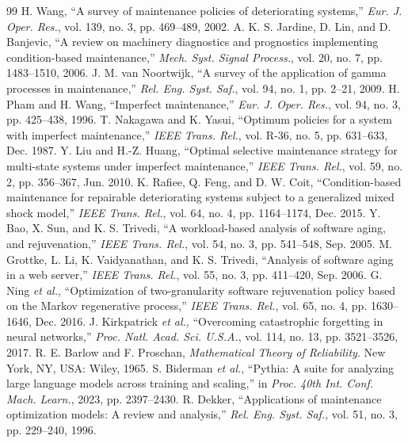 \documentclass[journal]{IEEEtran}
\begin{document}
\begin{thebibliography}{99}
 H. Wang, ``A survey of maintenance policies of deteriorating systems,'' \emph{Eur. J. Oper. Res.}, vol. 139, no. 3, pp. 469--489, 2002.
 A. K. S. Jardine, D. Lin, and D. Banjevic, ``A review on machinery diagnostics and prognostics implementing condition-based maintenance,'' \emph{Mech. Syst. Signal Process.}, vol. 20, no. 7, pp. 1483--1510, 2006.
 J. M. van Noortwijk, ``A survey of the application of gamma processes in maintenance,'' \emph{Rel. Eng. Syst. Saf.}, vol. 94, no. 1, pp. 2--21, 2009.
 H. Pham and H. Wang, ``Imperfect maintenance,'' \emph{Eur. J. Oper. Res.}, vol. 94, no. 3, pp. 425--438, 1996.
 T. Nakagawa and K. Yasui, ``Optimum policies for a system with imperfect maintenance,'' \emph{IEEE Trans. Rel.}, vol. R-36, no. 5, pp. 631--633, Dec. 1987.
 Y. Liu and H.-Z. Huang, ``Optimal selective maintenance strategy for multi-state systems under imperfect maintenance,'' \emph{IEEE Trans. Rel.}, vol. 59, no. 2, pp. 356--367, Jun. 2010.
 K. Rafiee, Q. Feng, and D. W. Coit, ``Condition-based maintenance for repairable deteriorating systems subject to a generalized mixed shock model,'' \emph{IEEE Trans. Rel.}, vol. 64, no. 4, pp. 1164--1174, Dec. 2015.
 Y. Bao, X. Sun, and K. S. Trivedi, ``A workload-based analysis of software aging, and rejuvenation,'' \emph{IEEE Trans. Rel.}, vol. 54, no. 3, pp. 541--548, Sep. 2005.
 M. Grottke, L. Li, K. Vaidyanathan, and K. S. Trivedi, ``Analysis of software aging in a web server,'' \emph{IEEE Trans. Rel.}, vol. 55, no. 3, pp. 411--420, Sep. 2006.
 G. Ning \emph{et al.}, ``Optimization of two-granularity software rejuvenation policy based on the Markov regenerative process,'' \emph{IEEE Trans. Rel.}, vol. 65, no. 4, pp. 1630--1646, Dec. 2016.
 J. Kirkpatrick \emph{et al.}, ``Overcoming catastrophic forgetting in neural networks,'' \emph{Proc. Natl. Acad. Sci. U.S.A.}, vol. 114, no. 13, pp. 3521--3526, 2017.
 R. E. Barlow and F. Proschan, \emph{Mathematical Theory of Reliability}. New York, NY, USA: Wiley, 1965.
 S. Biderman \emph{et al.}, ``Pythia: A suite for analyzing large language models across training and scaling,'' in \emph{Proc. 40th Int. Conf. Mach. Learn.}, 2023, pp. 2397--2430.
 R. Dekker, ``Applications of maintenance optimization models: A review and analysis,'' \emph{Rel. Eng. Syst. Saf.}, vol. 51, no. 3, pp. 229--240, 1996.

\end{thebibliography}
\end{document}
